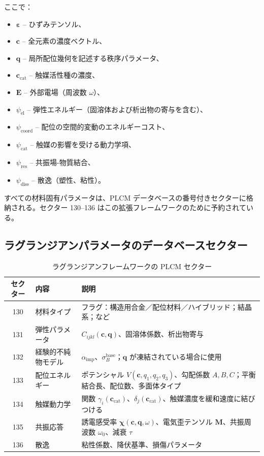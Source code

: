 \documentclass[11pt,a4paper]{article}
\theoremstyle{remark}
\begin{document}
	ここで：
	\begin{itemize}
		\item $\boldsymbol{\varepsilon}$ – ひずみテンソル、
		\item $\mathbf{c}$ – 全元素の濃度ベクトル、
		\item $\mathbf{q}$ – 局所配位幾何を記述する秩序パラメータ、
		\item $\mathbf{c}_{\mathrm{cat}}$ – 触媒活性種の濃度、
		\item $\mathbf{E}$ – 外部電場（周波数 $\omega$）、
		\item $\psi_{\mathrm{el}}$ – 弾性エネルギー（固溶体および析出物の寄与を含む）、
		\item $\psi_{\mathrm{coord}}$ – 配位の空間的変動のエネルギーコスト、
		\item $\psi_{\mathrm{cat}}$ – 触媒の影響を受ける動力学項、
		\item $\psi_{\mathrm{res}}$ – 共振場-物質結合、
		\item $\psi_{\mathrm{diss}}$ – 散逸（塑性、粘性）。
	\end{itemize}
	
	すべての材料固有パラメータは、PLCM データベースの番号付きセクターに格納される。セクター 130–136 はこの拡張フレームワークのために予約されている。
	
	\subsection{ラグランジアンパラメータのデータベースセクター}
	\label{subsec:sectors}
	
	\begin{table}[htbp]
		\centering
		\caption{ラグランジアンフレームワークの PLCM セクター}
		\label{tab:sectors}
		\begin{tabular}{clp{8cm}}
			\toprule
			\textbf{セクター} & \textbf{内容} & \textbf{説明} \\
			\midrule
			130 & 材料タイプ & フラグ：構造用合金／配位材料／ハイブリッド；結晶系；など \\
			131 & 弾性パラメータ & \(C_{ijkl}(\mathbf{c}, \mathbf{q})\)、固溶体係数、析出物寄与 \\
			132 & 経験的不純物モデル & \(\alpha_{\mathrm{imp}}\)、\(\sigma_B^{\mathrm{base}}\)；\(\mathbf{q}\) が凍結されている場合に使用 \\
			133 & 配位エネルギー & ポテンシャル \(V(\mathbf{c}, q_1,q_2,q_3)\)、勾配係数 \(A,B,C\)；平衡結合長、配位数、多面体タイプ \\
			134 & 触媒動力学 & 関数 \(\gamma_i(\mathbf{c}_{\mathrm{cat}})\)、\(\delta_j(\mathbf{c}_{\mathrm{cat}})\)、触媒濃度を緩和速度に結びつける \\
			135 & 共振応答 & 誘電感受率 \(\boldsymbol{\chi}(\mathbf{c},\mathbf{q},\omega)\)、電気歪テンソル \(\mathbf{M}\)、共振周波数 \(\omega_0\)、減衰 \(\tau\) \\
			136 & 散逸 & 粘性係数、降伏基準、損傷パラメータ \\
			\bottomrule
		\end{tabular}
	\end{table}
	
\end{document}
